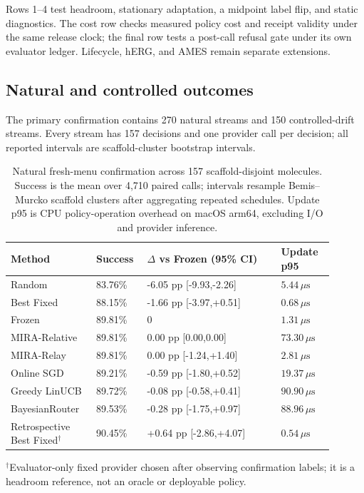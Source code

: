 \documentclass[sigconf,anonymous]{aamas}
\begin{document}
Rows 1--4 test headroom, stationary adaptation, a midpoint label flip, and static diagnostics. The cost row checks measured policy cost and receipt validity under the same release clock; the final row tests a post-call refusal gate under its own evaluator ledger. Lifecycle, hERG, and AMES remain separate extensions.

\subsection{Natural and controlled outcomes}
The primary confirmation contains 270 natural streams and 150 controlled-drift streams. Every stream has 157 decisions and one provider call per decision; all reported intervals are scaffold-cluster bootstrap intervals.

\begin{table}[H]
\vspace{-6pt}
\caption{Natural fresh-menu confirmation across 157 scaffold-disjoint molecules. Success is the mean over 4,710 paired calls; intervals resample Bemis--Murcko scaffold clusters after aggregating repeated schedules. Update p95 is CPU policy-operation overhead on macOS arm64, excluding I/O and provider inference.}
\label{tab:main-results}
\footnotesize
{\setlength{\tabcolsep}{2.0pt}
\begin{tabular}{@{}P{0.24\linewidth}P{0.13\linewidth}P{0.38\linewidth}P{0.15\linewidth}@{}}
\toprule
Method & Success & $\Delta$ vs Frozen (95\% CI) & Update p95 \\
\midrule
Random & 83.76\% & -6.05 pp [-9.93,-2.26] & $5.44\,\mu\mathrm{s}$ \\
Best Fixed & 88.15\% & -1.66 pp [-3.97,+0.51] & $0.68\,\mu\mathrm{s}$ \\
Frozen & 89.81\% & 0 & $1.31\,\mu\mathrm{s}$ \\
MIRA-Relative & 89.81\% & 0.00 pp [0.00,0.00] & $73.30\,\mu\mathrm{s}$ \\
MIRA-Relay & 89.81\% & 0.00 pp [-1.24,+1.40] & $2.81\,\mu\mathrm{s}$ \\
Online SGD & 89.21\% & -0.59 pp [-1.80,+0.52] & $19.37\,\mu\mathrm{s}$ \\
Greedy LinUCB & 89.72\% & -0.08 pp [-0.58,+0.41] & $90.90\,\mu\mathrm{s}$ \\
BayesianRouter & 89.53\% & -0.28 pp [-1.75,+0.97] & $88.96\,\mu\mathrm{s}$ \\
Retrospective Best Fixed$^{\dagger}$ & 90.45\% & +0.64 pp [-2.86,+4.07] & $0.54\,\mu\mathrm{s}$ \\
\bottomrule
\end{tabular}}
\begin{flushleft}
\footnotesize $^{\dagger}$Evaluator-only fixed provider chosen after observing confirmation labels; it is a headroom reference, not an oracle or deployable policy.
\end{flushleft}
\end{table}
\end{document}
